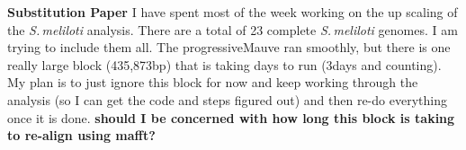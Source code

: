 \documentclass[12pt]{article}
\newcommand{\smel}{\textit{S.\,meliloti}\xspace}
\newcommand{\p}{progressiveMauve\xspace}
\newcommand{\strep}{\textit{Streptomyces}\xspace}
\newcommand{\ecol}{\textit{E.\,coli}\xspace}
\newcommand{\ecoli}{\textit{Escherichia coli}\xspace}
\newcommand{\pa}{pSymA\xspace}
\newcommand{\dn}{\textit{dN}\xspace}
\begin{document}

\textbf{Substitution Paper}
I have spent most of the week working on the up scaling of the \smel analysis.
There are a total of 23 complete \smel genomes. I am trying to include them all.
The \p ran smoothly, but there is one really large block (435,873bp) that is taking days to run (3days and counting).
My plan is to just ignore this block for now and keep working through the analysis (so I can get the code and steps figured out) and then re-do everything once it is done.
\textbf{should I be concerned with how long this block is taking to re-align using mafft?}
\end{document}
